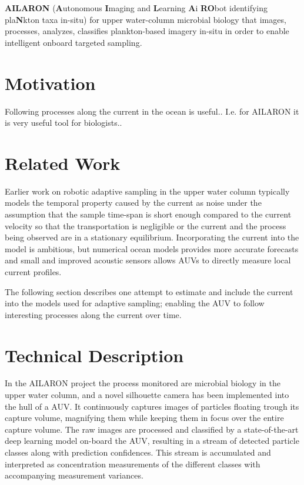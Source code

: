 \documentclass[conference]{IEEEtran}
\begin{document}
\textbf{AILARON} (\textbf{A}utonomous
\textbf{I}maging and \textbf{L}earning \textbf{A}i \textbf{RO}bot
identifying pla\textbf{N}kton taxa in-situ) for upper water-column
microbial biology that images, processes, analyzes, classifies plankton-based imagery in-situ in order
to enable intelligent onboard targeted sampling.

\section{Motivation}
Following processes along the current in the ocean is useful..
I.e. for AILARON it is very useful tool for biologists.. 

\section{Related Work}
Earlier work on robotic adaptive sampling in the upper water column typically models the temporal property caused by the current as noise under the assumption that the sample time-span is short enough compared to the current velocity so that the transportation is negligible or the current and the process being observed are in a stationary equilibrium.
Incorporating the current into the model is ambitious, but numerical ocean models provides more accurate forecasts and small and improved acoustic sensors allows AUVs to directly measure local current profiles.


The following section describes one attempt to estimate and include the current into the models used for adaptive sampling; enabling the AUV to follow interesting processes along the current over time.

\section{Technical Description}
In the AILARON project the process monitored are microbial biology in the upper water column, and a novel silhouette camera has been implemented into the hull of a AUV.
It continuously captures images of particles floating trough its capture volume, magnifying them while keeping them in focus over the entire capture volume.
The raw images are processed and classified by a state-of-the-art deep learning model on-board the AUV, resulting in a stream of detected particle classes along with prediction confidences.
This stream is accumulated and interpreted as concentration measurements of the different classes with accompanying measurement variances.
\end{document}
